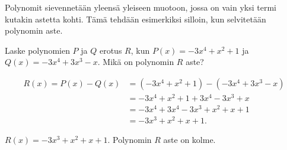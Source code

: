 Polynomit sievennetään yleensä yleiseen muotoon, jossa on vain yksi termi kutakin astetta kohti.
Tämä tehdään esimerkiksi silloin, kun selvitetään polynomin aste.

\begin{esimerkki}
    Laske polynomien $P$ ja $Q$ erotus $R$, kun $P(x)=-3x^4+x^2+1$ ja $Q(x)=-3x^4+3x^3-x$.
    Mikä on polynomin $R$ aste?
   \begin{esimratk}
        \begin{align*}
            R(x) = P(x)-Q(x) &= (-3x^4+x^2+1)-(-3x^4+3x^3-x) \\
                             &= -3x^4+x^2+1+3x^4-3x^3+x \\
                             &= -3x^4+3x^4-3x^3+x^2+x+1 \\
                             &= -3x^3+x^2+x+1.
        \end{align*}
    \end{esimratk}
    \begin{esimvast}
        $R(x) = -3x^3+x^2+x+1$. Polynomin $R$ aste on kolme.
    \end{esimvast}
\end{esimerkki}

